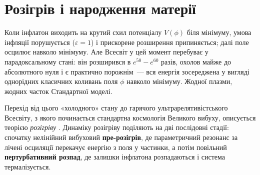 
\chapter{Розігрів і народження матерії}
\label{sec:reheating}

Коли інфлатон виходить на крутий схил потенціалу $V(\phi)$ біля мінімуму, умова
інфляції порушується ($\varepsilon = 1$) і прискорене
розширення припиняється; далі поле осцилює навколо мінімуму. Але Всесвіт у цей момент
перебуває у парадоксальному стані: він розширився в
$e^{50} - e^{60}$ разів, охолов майже до абсолютного нуля
і є практично порожнім~--- вся енергія зосереджена у
вигляді однорідних класичних коливань поля $\phi$ навколо
мінімуму. Жодної плазми, жодних часток Стандартної моделі.

Перехід від цього «холодного» стану до гарячого
ультрарелятивістського Всесвіту, з якого починається
стандартна космологія Великого вибуху, описується теорією
\emph{розігріву} \cite{kofman_1994, kofman_1997}. Динаміку
розігріву поділяють на дві послідовні стадії: спочатку
нелінійний вибуховий \textbf{пре-розігрів}, де параметричний
резонанс за лічені осциляції перекачує енергію з поля у
частинки, а потім повільний \textbf{пертурбативний розпад},
де залишки інфлатона розпадаються і система термалізується.

